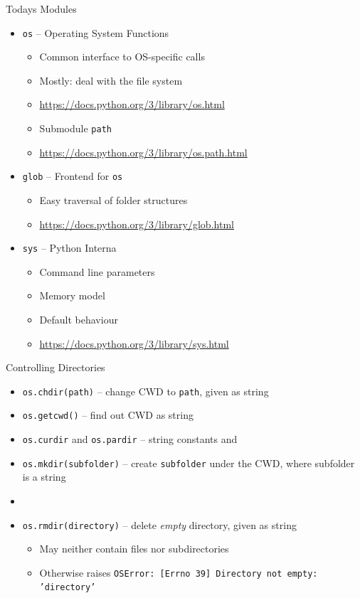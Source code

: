 
\begin{frame}{Todays Modules}
%
\begin{itemize}
\item \texttt{os} -- Operating System Functions
	\begin{itemize}
	\item Common interface to OS-specific calls
	\item Mostly: deal with the file system
	\item \url{https://docs.python.org/3/library/os.html}
	\item Submodule \texttt{path}
	\item \url{https://docs.python.org/3/library/os.path.html}
	\end{itemize}
\item \texttt{glob} -- Frontend for \texttt{os}
	\begin{itemize}
	\item Easy traversal of folder structures
	\item \url{https://docs.python.org/3/library/glob.html}
	\end{itemize}
\item \texttt{sys} -- Python Interna
	\begin{itemize}
	\item Command line parameters
	\item Memory model
	\item Default behaviour
	\item \url{https://docs.python.org/3/library/sys.html}
	\end{itemize}
\end{itemize}
%
\end{frame}


\begin{frame}{Controlling Directories}
%
\begin{itemize}
\item \texttt{os.chdir(path)} -- change CWD to \texttt{path}, given as string
\item \texttt{os.getcwd()} -- find out CWD as string
\item \texttt{os.curdir} and \texttt{os.pardir} -- string constants  and 
\item \texttt{os.mkdir(subfolder)} -- create \texttt{subfolder} under the CWD, where subfolder is a string
\item {}
\item \texttt{os.rmdir(directory)} -- delete \emph{empty} directory, given as string
	\begin{itemize}
	\item May neither contain files nor subdirectories
	\item Otherwise raises \texttt{OSError: [Errno 39] Directory not empty: 'directory'}
	\end{itemize}
\end{itemize}
%
\end{frame}

